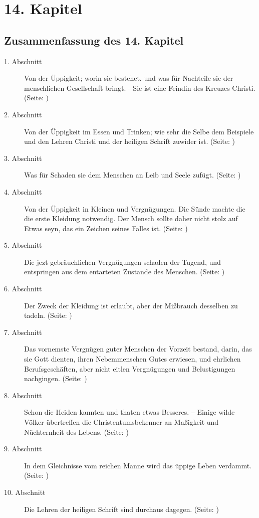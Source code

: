

\chapter{14. Kapitel} \label{kap14}

\section{Zusammenfassung des 14. Kapitel}
\small
\begin{description}
\item[1. Abschnitt] Von der Üppigkeit; worin sie bestehet. und was für Nachteile
sie der menschlichen Gesellschaft bringt. - Sie ist eine Feindin des Kreuzes
Christi. (Seite: \pageref{kap14_ab1})
\item[2. Abschnitt] Von der Üppigkeit im Essen und Trinken; wie sehr die Selbe
dem Beispiele und den Lehren Christi und der heiligen Schrift zuwider ist. (Seite: \pageref{kap14_ab2})
\item[3. Abschnitt] Was für Schaden sie dem Menschen an Leib und Seele zufügt. (Seite: \pageref{kap14_ab3})
\item[4. Abschnitt] Von der Üppigkeit in Kleinen und Vergnügungen. Die Sünde
machte die die erste Kleidung notwendig. Der Mensch sollte daher nicht stolz auf
Etwas seyn, das ein Zeichen seines Falles ist. (Seite: \pageref{kap14_ab4})
\item[5. Abschnitt] Die jezt gebräuchlichen Vergnügungen schaden der Tugend, und
entspringen aus dem entarteten Zustande des Menschen. (Seite: \pageref{kap14_ab5})
\item[6. Abschnitt] Der Zweck der Kleidung ist erlaubt, aber der Mißbrauch
desselben zu tadeln. (Seite: \pageref{kap14_ab6})
\item[7. Abschnitt] Das vornemste Vergnügen guter Menschen der Vorzeit bestand,
darin, das sie Gott dienten, ihren Nebemmenschen Gutes erwiesen, und ehrlichen
Berufsgeschäften, aber nicht eitlen Vergnügungen und Belustigungen nachgingen. (Seite: \pageref{kap14_ab7})
\item[8. Abschnitt] Schon die Heiden kannten und thaten etwas Besseres. --
Einige wilde Völker übertreffen die Christentumsbekenner an Maßigkeit und
Nüchternheit des Lebens. (Seite: \pageref{kap14_ab8})
\item[9. Abschnitt] In dem Gleichnisse vom reichen Manne wird das üppige Leben
verdammt. (Seite: \pageref{kap14_ab9})
\item[10. Abschnitt] Die Lehren der heiligen Schrift sind durchaus dagegen. (Seite: \pageref{kap14_ab10})
\end{description}
\normalsize

